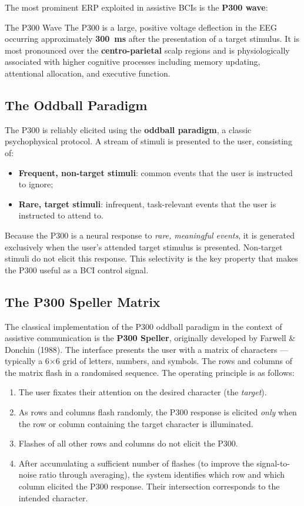 \documentclass[10pt, letterpaper]{report}
\begin{document}
The most prominent ERP exploited in assistive BCIs is the \textbf{P300 wave}:

\begin{boxdefinition}{The P300 Wave}{}
The P300 is a large, positive voltage deflection in the EEG occurring approximately
\textbf{300~ms} after the presentation of a target stimulus. It is most pronounced over
the \textbf{centro-parietal} scalp regions and is physiologically associated with higher
cognitive processes including memory updating, attentional allocation, and executive
function.
\end{boxdefinition}

\subsection{The Oddball Paradigm}

The P300 is reliably elicited using the \textbf{oddball paradigm}, a classic psychophysical
protocol. A stream of stimuli is presented to the user, consisting of:

\begin{itemize}
  \item \textbf{Frequent, non-target stimuli}: common events that the user is instructed
  to ignore;
  \item \textbf{Rare, target stimuli}: infrequent, task-relevant events that the user is
  instructed to attend to.
\end{itemize}

Because the P300 is a neural response to \emph{rare, meaningful events}, it is generated
exclusively when the user's attended target stimulus is presented. Non-target stimuli do
not elicit this response. This selectivity is the key property that makes the P300 useful as
a BCI control signal.

\subsection{The P300 Speller Matrix}

The classical implementation of the P300 oddball paradigm in the context of assistive
communication is the \textbf{P300 Speller}, originally developed by Farwell \& Donchin (1988).
The interface presents the user with a matrix of characters — typically a 6$\times$6 grid of
letters, numbers, and symbols. The rows and columns of the matrix flash in a randomised
sequence.
The operating principle is as follows:
\begin{enumerate}
  \item The user fixates their attention on the desired character (the \emph{target}).
  \item As rows and columns flash randomly, the P300 response is elicited \emph{only}
  when the row or column containing the target character is illuminated.
  \item Flashes of all other rows and columns do not elicit the P300.
  \item After accumulating a sufficient number of flashes (to improve the signal-to-noise
  ratio through averaging), the system identifies which row and which column elicited the
  P300 response. Their intersection corresponds to the intended character.
\end{enumerate}
\end{document}
